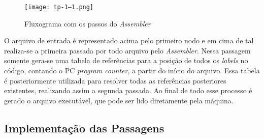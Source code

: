 \documentclass{article}
\begin{document}
\begin{figure}[h!]
\centering
\texttt{[image: tp-1--1.png]}
\caption{Fluxograma com os passos do \textit{Assembler}}
\label{fig:trieExample}
\end{figure}

O arquivo de entrada é representado acima pelo primeiro nodo e em cima de tal realiza-se a primeira passada por todo arquivo pelo \textit{Assembler}. Nessa passagem somente gera-se uma tabela de referências para a posição de todos os \textit{labels} no código, contando o PC \textit{program counter}, a partir do início do arquivo. Essa tabela é posteriormente utilizada para resolver todas as referências posteriores existentes, realizando assim a segunda passada. Ao final de todo esse processo é gerado o arquivo executável, que pode ser lido diretamente pela máquina.

\subsection{Implementação das Passagens}




\end{document}
